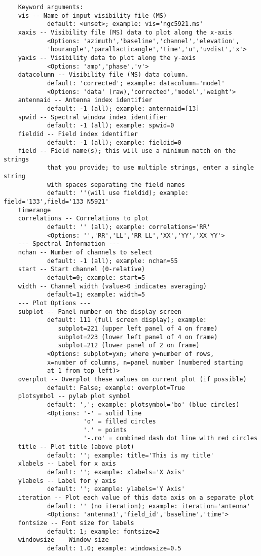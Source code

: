 \small
\begin{verbatim}
    Keyword arguments:
    vis -- Name of input visibility file (MS)
            default: <unset>; example: vis='ngc5921.ms'
    xaxis -- Visibility file (MS) data to plot along the x-axis
            <Options: 'azimuth','baseline','channel','elevation',
            'hourangle','parallacticangle','time','u','uvdist','x'>
    yaxis -- Visibility data to plot along the y-axis
            <Options: 'amp','phase','v'>
    datacolumn -- Visibility file (MS) data column.
            default: 'corrected'; example: datacolumn='model'
            <Options: 'data' (raw),'corrected','model','weight'>
    antennaid -- Antenna index identifier
            default: -1 (all); example: antennaid=[13]
    spwid -- Spectral window index identifier
            default: -1 (all); example: spwid=0
    fieldid -- Field index identifier
            default: -1 (all); example: fieldid=0
    field -- Field name(s); this will use a minimum match on the strings
            that you provide; to use multiple strings, enter a single string
            with spaces separating the field names
            default: ''(will use fieldid); example: field='133',field='133 N5921'
    timerange
    correlations -- Correlations to plot
            default: '' (all); example: correlations='RR'
            <Options: '','RR','LL','RR LL','XX','YY','XX YY'>
    --- Spectral Information ---
    nchan -- Number of channels to select
            default: -1 (all); example: nchan=55
    start -- Start channel (0-relative)
            default=0; example: start=5
    width -- Channel width (value>0 indicates averaging)
            default=1; example: width=5
    --- Plot Options ---
    subplot -- Panel number on the display screen
            default: 111 (full screen display); example:
               subplot=221 (upper left panel of 4 on frame)
               subplot=223 (lower left panel of 4 on frame)
               subplot=212 (lower panel of 2 on frame)
            <Options: subplot=yxn; where y=number of rows,
            x=number of columns, n=panel number (numbered starting
            at 1 from top left)>
    overplot -- Overplot these values on current plot (if possible)
            default: False; example: overplot=True
    plotsymbol -- pylab plot symbol
            default: ','; example: plotsymbol='bo' (blue circles)
            <Options: '-' = solid line
                      'o' = filled circles
                      '.' = points
                      '-.ro' = combined dash dot line with red circles
    title -- Plot title (above plot)
            default: ''; example: title='This is my title'
    xlabels -- Label for x axis
            default: ''; example: xlabels='X Axis'
    ylabels -- Label for y axis
            default: ''; example: ylabels='Y Axis'
    iteration -- Plot each value of this data axis on a separate plot
            default: '' (no iteration); example: iteration='antenna'
            <Options: 'antenna1','field_id','baseline','time'>
    fontsize -- Font size for labels
            default: 1; example: fontsize=2
    windowsize -- Window size
            default: 1.0; example: windowsize=0.5
\end{verbatim}
\normalsize

